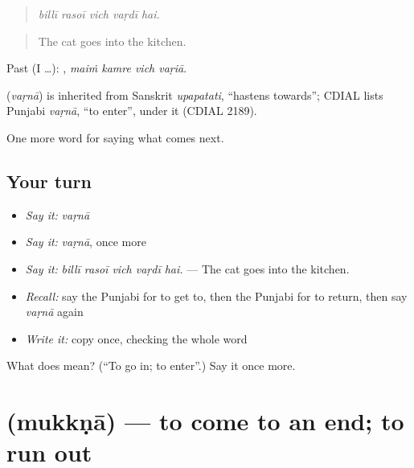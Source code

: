 \begin{quote}
    
\end{quote}

\begin{quote}
\emph{billī rasoī vich vaṛdī hai.}
\end{quote}

\begin{quote}
The cat goes into the kitchen.
\end{quote}

Past (I …):    , \emph{maiṁ kamre vich vaṛiā}.

\begin{cousinweb}
\textbf{} (\emph{vaṛnā}) is inherited from Sanskrit \emph{upapatati}, \textquotedblleft{}hastens towards\textquotedblright{}; CDIAL lists Punjabi \emph{vaṛnā}, \textquotedblleft{}to enter\textquotedblright{}, under it (CDIAL 2189).
\end{cousinweb}

\begin{grammarlens}[title={What you've built}]
One more word for saying what comes next.
\end{grammarlens}

\subsection*{Your turn}
\begin{itemize}
\raggedright
  \item \emph{Say it:} \emph{vaṛnā}
  \item \emph{Say it:} \emph{vaṛnā}, once more
  \item \emph{Say it:} \emph{billī rasoī vich vaṛdī hai.} — The cat goes into the kitchen.
  \item \emph{Recall:} say the Punjabi for to get to, then the Punjabi for to return, then say \emph{vaṛnā} again
  \item \emph{Write it:} copy \textbf{} once, checking the whole word
\end{itemize}

\begin{tcolorbox}[breakable,colback=teal!4,colframe=teal!35!black,title={Before you move on}]
What does  mean? (\textquotedblleft{}To go in; to enter\textquotedblright{}.) Say it once more.
\end{tcolorbox}
\section[\texorpdfstring{\pa{ਮੁੱਕਣਾ} (mukkṇā)}{ਮੁੱਕਣਾ (mukkṇā)}]{ (mukkṇā) — to come to an end; to run out}

